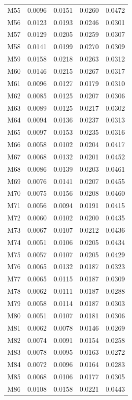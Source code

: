 \begin{longtable}{lrrrr}
M55 & 0.0096 & 0.0151 & 0.0260 & 0.0472 \\
M56 & 0.0123 & 0.0193 & 0.0246 & 0.0301 \\
M57 & 0.0129 & 0.0205 & 0.0259 & 0.0307 \\
M58 & 0.0141 & 0.0199 & 0.0270 & 0.0309 \\
M59 & 0.0158 & 0.0218 & 0.0263 & 0.0312 \\
M60 & 0.0146 & 0.0215 & 0.0267 & 0.0317 \\
M61 & 0.0096 & 0.0127 & 0.0179 & 0.0310 \\
M62 & 0.0085 & 0.0125 & 0.0207 & 0.0306 \\
M63 & 0.0089 & 0.0125 & 0.0217 & 0.0302 \\
M64 & 0.0094 & 0.0136 & 0.0237 & 0.0313 \\
M65 & 0.0097 & 0.0153 & 0.0235 & 0.0316 \\
M66 & 0.0058 & 0.0102 & 0.0204 & 0.0417 \\
M67 & 0.0068 & 0.0132 & 0.0201 & 0.0452 \\
M68 & 0.0086 & 0.0139 & 0.0203 & 0.0461 \\
M69 & 0.0076 & 0.0141 & 0.0207 & 0.0455 \\
M70 & 0.0075 & 0.0156 & 0.0208 & 0.0460 \\
M71 & 0.0056 & 0.0094 & 0.0191 & 0.0415 \\
M72 & 0.0060 & 0.0102 & 0.0200 & 0.0435 \\
M73 & 0.0067 & 0.0107 & 0.0212 & 0.0436 \\
M74 & 0.0051 & 0.0106 & 0.0205 & 0.0434 \\
M75 & 0.0057 & 0.0107 & 0.0205 & 0.0429 \\
M76 & 0.0065 & 0.0132 & 0.0187 & 0.0323 \\
M77 & 0.0065 & 0.0115 & 0.0187 & 0.0309 \\
M78 & 0.0062 & 0.0111 & 0.0187 & 0.0288 \\
M79 & 0.0058 & 0.0114 & 0.0187 & 0.0303 \\
M80 & 0.0051 & 0.0107 & 0.0181 & 0.0306 \\
M81 & 0.0062 & 0.0078 & 0.0146 & 0.0269 \\
M82 & 0.0074 & 0.0091 & 0.0154 & 0.0258 \\
M83 & 0.0078 & 0.0095 & 0.0163 & 0.0272 \\
M84 & 0.0072 & 0.0096 & 0.0164 & 0.0283 \\
M85 & 0.0068 & 0.0106 & 0.0177 & 0.0305 \\
M86 & 0.0108 & 0.0158 & 0.0221 & 0.0443 \\

\end{longtable}
